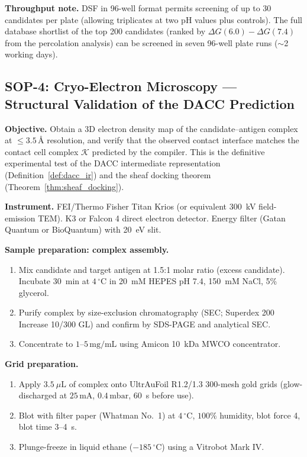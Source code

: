 \noindent\textbf{Throughput note.}  DSF in 96-well format permits screening of
up to 30 candidates per plate (allowing triplicates at two pH values plus
controls).  The full database shortlist of the top 200 candidates (ranked by
$\Delta G(6.0) - \Delta G(7.4)$ from the percolation analysis) can be
screened in seven 96-well plate runs ($\sim$2 working days).

\subsection{SOP-4: Cryo-Electron Microscopy --- Structural Validation of the
            DACC Prediction}
\label{subsec:sop4_cryoem}

\noindent\textbf{Objective.}  Obtain a 3D electron density map of the
candidate--antigen complex at $\le 3.5\,\text{\AA}$ resolution, and verify
that the observed contact interface matches the contact cell complex
$\mathcal{K}$ predicted by the \ToposLang{} compiler.  This is the definitive
experimental test of the DACC intermediate representation
(Definition~\ref{def:dacc_ir}) and the sheaf docking theorem
(Theorem~\ref{thm:sheaf_docking}).

\noindent\textbf{Instrument.}  FEI/Thermo Fisher Titan Krios (or equivalent
300~kV field-emission TEM).  K3 or Falcon 4 direct electron detector.
Energy filter (Gatan Quantum or BioQuantum) with 20~eV slit.

\noindent\textbf{Sample preparation: complex assembly.}
\begin{enumerate}[leftmargin=1.5cm, label=\arabic*.]
  \item Mix candidate and target antigen at 1.5:1 molar ratio (excess
        candidate).  Incubate 30~min at $4\,^\circ\mathrm{C}$ in
        20~mM HEPES pH 7.4, 150~mM NaCl, 5\% glycerol.
  \item Purify complex by size-exclusion chromatography (SEC; Superdex 200
        Increase 10/300 GL) and confirm by SDS-PAGE and analytical SEC.
  \item Concentrate to $1$--$5\,\mathrm{mg/mL}$ using Amicon 10~kDa MWCO
        concentrator.
\end{enumerate}

\noindent\textbf{Grid preparation.}
\begin{enumerate}[leftmargin=1.5cm, label=\arabic*.]
  \item Apply $3.5~\mu\mathrm{L}$ of complex onto UltrAuFoil R1.2/1.3 300-mesh
        gold grids (glow-discharged at $25\,\mathrm{mA}$, $0.4\,\mathrm{mbar}$,
        60~s before use).
  \item Blot with filter paper (Whatman No.\ 1) at $4\,^\circ\mathrm{C}$,
        $100\%$ humidity, blot force 4, blot time 3--4~s.
  \item Plunge-freeze in liquid ethane ($-185\,^\circ\mathrm{C}$) using a
        Vitrobot Mark IV.
\end{enumerate}

